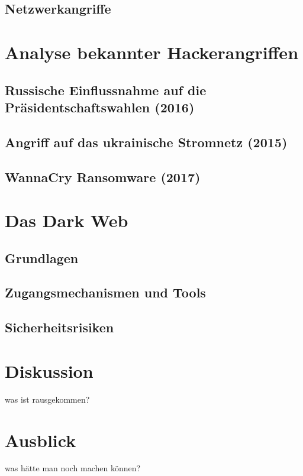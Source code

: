 \documentclass[11pt, a4paper]{article}
\begin{document}
\subsection{Netzwerkangriffe}


\section{Analyse bekannter Hackerangriffen}

\subsection{Russische Einflussnahme auf die Präsidentschaftswahlen (2016)}

\subsection{Angriff auf das ukrainische Stromnetz (2015)}

\subsection{WannaCry Ransomware (2017)}


\section{Das Dark Web}

\subsection{Grundlagen}

\subsection{Zugangsmechanismen und Tools}

\subsection{Sicherheitsrisiken}

\section{Diskussion}
was ist rausgekommen?

\section{Ausblick}
was hätte man noch machen können?
\end{document}
